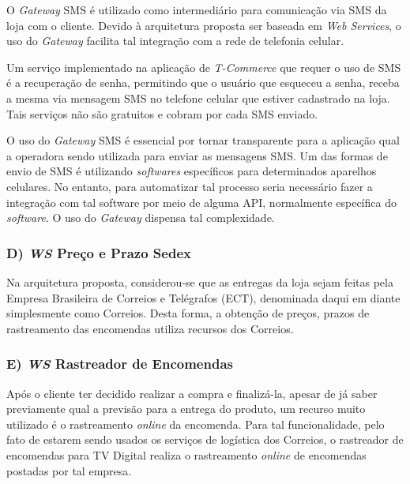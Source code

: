 O \textit{Gateway} SMS é utilizado como intermediário para comunicação via SMS da loja com o cliente.
Devido à arquitetura proposta ser baseada em \textit{Web Services}, o uso do \textit{Gateway} facilita tal 
integração com a rede de telefonia celular.

Um serviço implementado na aplicação de \textit{T-Commerce} que requer o uso de SMS é a recuperação de senha, permitindo
que o usuário que esqueceu a senha, receba a mesma via mensagem SMS no telefone celular
que estiver cadastrado na loja. Tais serviços não são gratuitos e cobram por cada SMS enviado. 

O uso do \textit{Gateway} SMS é essencial por tornar transparente para a aplicação qual a operadora sendo utilizada
para enviar as mensagens SMS. Um das formas de envio de SMS é utilizando \textit{softwares} específicos para determinados
aparelhos celulares. No entanto, para automatizar tal processo seria necessário fazer a integração
com tal software por meio de alguma API, normalmente específica do \textit{software}. O uso
do \textit{Gateway} dispensa tal complexidade.

\subsubsection*{D) \textit{WS} Preço e Prazo Sedex}

Na arquitetura proposta, considerou-se que as entregas da loja
sejam feitas pela Empresa Brasileira de Correios e Telégrafos (ECT),
denominada daqui em diante simplesmente como Correios. Desta forma, a obtenção de preços,
prazos de rastreamento das encomendas utiliza recursos dos Correios. 

\subsubsection*{E) \textit{WS} Rastreador de Encomendas}

Após o cliente ter decidido realizar a compra e finalizá-la, apesar
de já saber previamente qual a previsão para a entrega do produto,
um recurso muito utilizado é o rastreamento \textit{online} da encomenda.
Para tal funcionalidade, pelo fato de estarem sendo usados
os serviços de logística dos Correios, o rastreador
de encomendas para TV Digital realiza o rastreamento
\textit{online} de encomendas postadas por tal empresa. 

